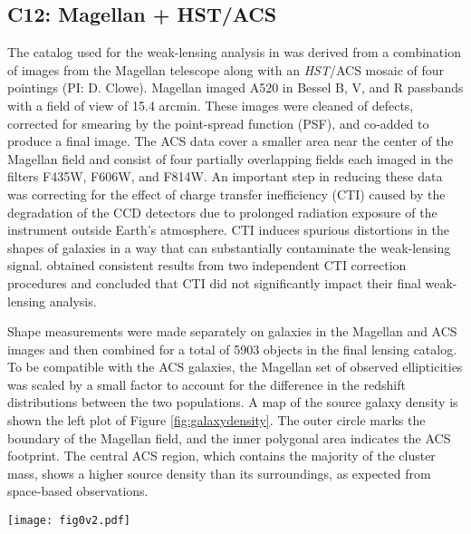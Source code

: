 \documentclass[iop,twocolappendix]{emulateapj}
\newcommand{\cta}[1]{\citetalias{#1}}
\begin{document}
\subsection{C12: Magellan + HST/ACS}\label{ssec:C12data}
The catalog used for the weak-lensing analysis in \cta{C12} was derived from a 
combination of images from the Magellan telescope along with an \textit{HST}/ACS mosaic of 
four pointings (PI: D. Clowe).
Magellan imaged A520 in Bessel B, V, and R passbands with a field of view of 15.4 arcmin. These 
images were cleaned of defects, corrected for smearing by the point-spread function (PSF), 
and co-added to produce a final image. 
The ACS data cover a smaller area near the center of the Magellan field and consist of four
partially overlapping fields each imaged in the filters F435W, F606W, and F814W. An important 
step in reducing these data was correcting for the effect of charge transfer inefficiency (CTI)
caused by the degradation of the CCD detectors due to prolonged radiation exposure of the 
instrument outside Earth's atmosphere. CTI induces spurious distortions in the shapes of galaxies 
in a way that can substantially contaminate the weak-lensing signal. \cta{C12} obtained 
consistent results from two independent CTI correction procedures and concluded that CTI did not 
significantly impact their final weak-lensing analysis.

Shape measurements were made separately on galaxies in the Magellan and ACS images and then 
combined for a total of 5903 objects in the final lensing catalog. To be compatible with the ACS
galaxies, the Magellan set of observed ellipticities was scaled by a small factor to account for 
the difference in the redshift distributions between the two populations.
A map of the source galaxy density 
is shown the left plot of Figure \ref{fig:galaxydensity}. The outer circle marks the boundary 
of the Magellan field, and the inner polygonal area indicates the ACS footprint. The central ACS 
region, which contains the majority of the cluster mass, shows a higher source density than its 
surroundings, as expected from space-based observations. 

\begin{figure*}
\centering
\texttt{[image: fig0v2.pdf]}
\caption{Source galaxy density maps from \cta{C12} (left) and \cta{J14} (right) 
         data sets. The \cta{C12} ellipticity catalog is derived from a combination of Magellan 
         and \textit{HST}/ACS images with galaxy number densities of 22 arcmin${}^{-2}$ and 56 
         arcmin${}^{-2}$, respectively. The \cta{J14} catalog comes from the same ACS data 
         as \cta{C12}, but exhibits a higher galaxy density of 109 arcmin${}^{-2}$ due to a 
         different reduction pipeline.}
\label{fig:galaxydensity}
\end{figure*}
\end{document}
